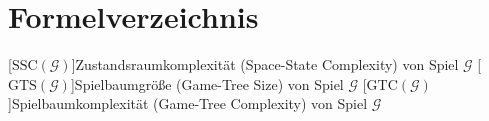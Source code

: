 \chapter*{Formelverzeichnis}

\DeclareSIUnit{}

\newcommand{\acrounit}[1]{
    \acroextra{\makebox[13mm][l]{\si[per-mode=fraction,fraction-function=\sfrac]{#1}}}
}
\def\acrospace{\acroextra{\makebox[14.375mm][l]{}}}


\begin{acronym}[WYSISWG] %


    [\ensuremath{\text{SSC}(\mathcal{G})}]{Zustandsraumkomplexität (Space-State Complexity) von Spiel $\mathcal{G}$}
    [\ensuremath{\text{GTS}(\mathcal{G})}]{Spielbaumgröße (Game-Tree Size) von Spiel $\mathcal{G}$}
    [\ensuremath{\text{GTC}(\mathcal{G})}]{Spielbaumkomplexität (Game-Tree Complexity) von Spiel $\mathcal{G}$}







\end{acronym}

